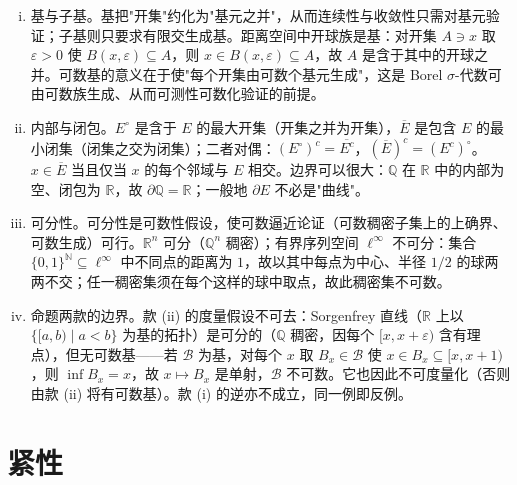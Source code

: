 \documentclass[../main.tex]{subfiles}
\begin{document}
\begin{remark}\label{remark:appA-可分}
\begin{enumerate}[(i)]
\item 基与子基。基把"开集"约化为"基元之并"，从而连续性与收敛性只需对基元验证；子基则只要求有限交生成基。距离空间中开球族是基：对开集 $A\ni x$ 取 $\varepsilon>0$ 使 $B(x,\varepsilon)\subseteq A$，则 $x\in B(x,\varepsilon)\subseteq A$，故 $A$ 是含于其中的开球之并。可数基的意义在于使"每个开集由可数个基元生成"，这是 Borel $\sigma$-代数可由可数族生成、从而可测性可数化验证的前提。
\item 内部与闭包。$E^\circ$ 是含于 $E$ 的最大开集（开集之并为开集），$\overline{E}$ 是包含 $E$ 的最小闭集（闭集之交为闭集）；二者对偶：$(E^\circ)^c=\overline{E^c}$，$(\overline{E})^c=(E^c)^\circ$。$x\in\overline{E}$ 当且仅当 $x$ 的每个邻域与 $E$ 相交。边界可以很大：$\mathbb{Q}$ 在 $\mathbb{R}$ 中的内部为空、闭包为 $\mathbb{R}$，故 $\partial\mathbb{Q}=\mathbb{R}$；一般地 $\partial E$ 不必是"曲线"。
\item 可分性。可分性是可数性假设，使可数逼近论证（可数稠密子集上的上确界、可数生成）可行。$\mathbb{R}^n$ 可分（$\mathbb{Q}^n$ 稠密）；有界序列空间 $\ell^\infty$ 不可分：集合 $\{0,1\}^{\mathbb{N}}\subseteq\ell^\infty$ 中不同点的距离为 $1$，故以其中每点为中心、半径 $1/2$ 的球两两不交；任一稠密集须在每个这样的球中取点，故此稠密集不可数。
\item 命题两款的边界。款 (ii) 的度量假设不可去：Sorgenfrey 直线（$\mathbb{R}$ 上以 $\{[a,b)\mid a<b\}$ 为基的拓扑）是可分的（$\mathbb{Q}$ 稠密，因每个 $[x,x+\varepsilon)$ 含有理点），但无可数基——若 $\mathscr{B}$ 为基，对每个 $x$ 取 $B_x\in\mathscr{B}$ 使 $x\in B_x\subseteq[x,x+1)$，则 $\inf B_x=x$，故 $x\mapsto B_x$ 是单射，$\mathscr{B}$ 不可数。它也因此不可度量化（否则由款 (ii) 将有可数基）。款 (i) 的逆亦不成立，同一例即反例。
\end{enumerate}
\end{remark}

\section{紧性}\label{section:appA-紧性}
\end{document}
